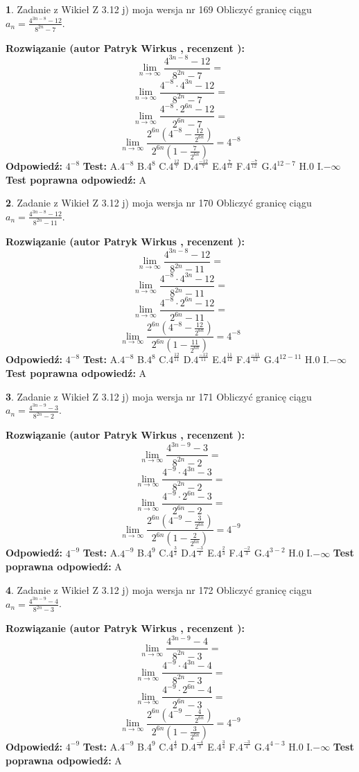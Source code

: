 \documentclass[12pt, a4paper]{article}
\theoremstyle{definition} %
\newtheorem{zad}{}
\newcommand{\zadStart}[1]{\begin{zad}#1\newline}
\newcommand{\zadStop}{\end{zad}}
\newcommand{\rozwStart}[2]{\noindent \textbf{Rozwiązanie (autor #1 , recenzent #2): }\newline}
\newcommand{\rozwStop}{\newline}
\newcommand{\odpStart}{\noindent \textbf{Odpowiedź:}\newline}
\newcommand{\odpStop}{\newline}
\newcommand{\testStart}{\noindent \textbf{Test:}\newline}
\newcommand{\testStop}{\newline}
\newcommand{\kluczStart}{\noindent \textbf{Test poprawna odpowiedź:}\newline}
\newcommand{\kluczStop}{\newline}
\begin{document}
\zadStart{Zadanie z Wikieł Z 3.12 j) moja wersja nr 169}
Obliczyć granicę ciągu $a_{n}=\frac{4^{3n-8}-12}{8^{2n}-7}$.
\zadStop
\rozwStart{Patryk Wirkus}{}
$$\lim\limits_{n\to\infty}\frac{4^{3n-8}-12}{8^{2n}-7}=$$
$$\lim\limits_{n\to\infty}\frac{4^{-8} \cdot 4^{3n}-12}{8^{2n}-7}=$$
$$\lim\limits_{n\to\infty}\frac{4^{-8} \cdot 2^{6n}-12}{2^{6n}-7}=$$
$$\lim\limits_{n\to\infty}\frac{2^{6n}(4^{-8} - \frac{12}{2^{6n}})}{2^{6n}(1-\frac{7}{2^{6n}})}= 4^{-8}$$
\rozwStop
\odpStart
$4^{-8}$
\odpStop
\testStart
A.$4^{-8}$
B.$4^{8}$
C.$4^{\frac{12}{7}}$
D.$4^{\frac{-12}{7}}$
E.$4^{\frac{7}{12}}$
F.$4^{\frac{-7}{12}}$
G.$4^{12-7}$
H.$0$
I.$-\infty$
\testStop
\kluczStart
A
\kluczStop



\zadStart{Zadanie z Wikieł Z 3.12 j) moja wersja nr 170}
Obliczyć granicę ciągu $a_{n}=\frac{4^{3n-8}-12}{8^{2n}-11}$.
\zadStop
\rozwStart{Patryk Wirkus}{}
$$\lim\limits_{n\to\infty}\frac{4^{3n-8}-12}{8^{2n}-11}=$$
$$\lim\limits_{n\to\infty}\frac{4^{-8} \cdot 4^{3n}-12}{8^{2n}-11}=$$
$$\lim\limits_{n\to\infty}\frac{4^{-8} \cdot 2^{6n}-12}{2^{6n}-11}=$$
$$\lim\limits_{n\to\infty}\frac{2^{6n}(4^{-8} - \frac{12}{2^{6n}})}{2^{6n}(1-\frac{11}{2^{6n}})}= 4^{-8}$$
\rozwStop
\odpStart
$4^{-8}$
\odpStop
\testStart
A.$4^{-8}$
B.$4^{8}$
C.$4^{\frac{12}{11}}$
D.$4^{\frac{-12}{11}}$
E.$4^{\frac{11}{12}}$
F.$4^{\frac{-11}{12}}$
G.$4^{12-11}$
H.$0$
I.$-\infty$
\testStop
\kluczStart
A
\kluczStop



\zadStart{Zadanie z Wikieł Z 3.12 j) moja wersja nr 171}
Obliczyć granicę ciągu $a_{n}=\frac{4^{3n-9}-3}{8^{2n}-2}$.
\zadStop
\rozwStart{Patryk Wirkus}{}
$$\lim\limits_{n\to\infty}\frac{4^{3n-9}-3}{8^{2n}-2}=$$
$$\lim\limits_{n\to\infty}\frac{4^{-9} \cdot 4^{3n}-3}{8^{2n}-2}=$$
$$\lim\limits_{n\to\infty}\frac{4^{-9} \cdot 2^{6n}-3}{2^{6n}-2}=$$
$$\lim\limits_{n\to\infty}\frac{2^{6n}(4^{-9} - \frac{3}{2^{6n}})}{2^{6n}(1-\frac{2}{2^{6n}})}= 4^{-9}$$
\rozwStop
\odpStart
$4^{-9}$
\odpStop
\testStart
A.$4^{-9}$
B.$4^{9}$
C.$4^{\frac{3}{2}}$
D.$4^{\frac{-3}{2}}$
E.$4^{\frac{2}{3}}$
F.$4^{\frac{-2}{3}}$
G.$4^{3-2}$
H.$0$
I.$-\infty$
\testStop
\kluczStart
A
\kluczStop



\zadStart{Zadanie z Wikieł Z 3.12 j) moja wersja nr 172}
Obliczyć granicę ciągu $a_{n}=\frac{4^{3n-9}-4}{8^{2n}-3}$.
\zadStop
\rozwStart{Patryk Wirkus}{}
$$\lim\limits_{n\to\infty}\frac{4^{3n-9}-4}{8^{2n}-3}=$$
$$\lim\limits_{n\to\infty}\frac{4^{-9} \cdot 4^{3n}-4}{8^{2n}-3}=$$
$$\lim\limits_{n\to\infty}\frac{4^{-9} \cdot 2^{6n}-4}{2^{6n}-3}=$$
$$\lim\limits_{n\to\infty}\frac{2^{6n}(4^{-9} - \frac{4}{2^{6n}})}{2^{6n}(1-\frac{3}{2^{6n}})}= 4^{-9}$$
\rozwStop
\odpStart
$4^{-9}$
\odpStop
\testStart
A.$4^{-9}$
B.$4^{9}$
C.$4^{\frac{4}{3}}$
D.$4^{\frac{-4}{3}}$
E.$4^{\frac{3}{4}}$
F.$4^{\frac{-3}{4}}$
G.$4^{4-3}$
H.$0$
I.$-\infty$
\testStop
\kluczStart
A
\kluczStop
\end{document}
